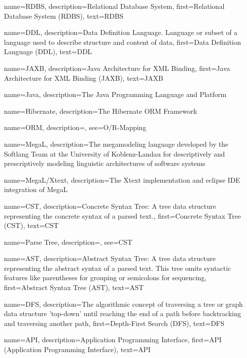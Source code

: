 {
    name=RDBS,
    description={Relational Database System},
    first={Relational Database System (RDBS)},
    text={RDBS}
}

{
    name=DDL,
    description={Data Definition Language. Language or subset of a language used to describe structure and content of data},
    first={Data Definition Language (DDL)},
    text={DDL}
}

{
    name=JAXB,
    description={Java Architecture for XML Binding},
    first={Java Architecture for XML Binding (JAXB)},
    text={JAXB}
}

{
    name=Java,
    description={The Java Programming Language and Platform}
}

{
    name=Hibernate,
    description={The Hibernate \gls{ORM} Framework}
}

{
    name=ORM,
    description={},
    see={O/R-Mapping}
}

{
    name=MegaL,
    description={The megamodeling language developed by the Softlang Team at the University of Koblenz-Landau for descriptively and prescriptively modeling linguistic architectures of software systems}
}

{
    name=MegaL/Xtext,
    description={The Xtext implementation and eclipse IDE integration of \gls{MegaL}}
}

{
    name=CST,
    description={Concrete Syntax Tree: A tree data structure representing the concrete syntax of a parsed text.},
    first={Concrete Syntax Tree (CST)},
    text={CST}
}

{
    name={Parse Tree},
    description={},
    see={CST}
}

{
    name=AST,
    description={Abstract Syntax Tree: A tree data structure representing the abstract syntax of a parsed text. This tree omits syntactic features like parentheses for grouping or semicolons for sequencing},
    first={Abstract Syntax Tree (AST)},
    text={AST}
}

{
    name=DFS,
    description={The algorithmic concept of traversing a tree or graph data structure 'top-down' until reaching the end of a path before backtracking and traversing another path},
    first={Depth-First Search (DFS)},
    text={DFS}
}

{
    name=API,
    description={Application Programming Interface},
    first={API (Application Programming Interface)},
    text={API}
}

